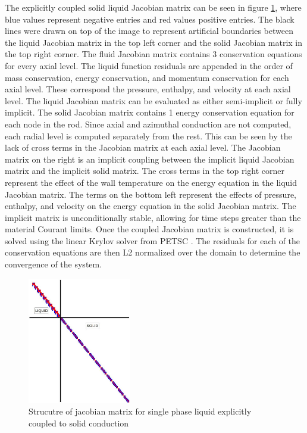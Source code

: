 	The explicitly coupled solid liquid Jacobian matrix can be seen in figure
	\ref{fig:Explicit-Diagram}, where blue values represent negative entries and
	red values positive entries. The black lines were drawn on top of the image to
	represent artificial boundaries between the liquid Jacobian matrix in the top
	left corner and the solid Jacobian matrix in the top right corner. The fluid
	Jacobian matrix contains 3 conservation equations for every axial level. The
	liquid function residuals are appended in the order of mass conservation,
	energy conservation, and momentum conservation for each axial level. These
	correspond the pressure, enthalpy, and velocity at each axial level. The liquid
	Jacobian matrix can be evaluated as either semi-implicit or fully implicit. The
	solid Jacobian matrix contains 1 energy conservation equation for each node in
	the rod. Since axial and azimuthal conduction are not computed, each radial
	level is computed separately from the rest. This can be seen by the lack of
	cross terms in the Jacobian matrix at each axial level. The Jacobian matrix on
	the right is an implicit coupling between the implicit liquid Jacobian matrix
	and the implicit solid matrix. The cross terms in the top right corner
	represent the effect of the wall temperature on the energy equation in the
	liquid Jacobian matrix. The terms on the bottom left represent the effects of
	pressure, enthalpy, and velocity on the energy equation in the solid Jacobian
	matrix. The implicit matrix is unconditionally stable, allowing for time steps
	greater than the material Courant limits. Once the coupled Jacobian matrix is
	constructed, it is solved using the linear Krylov solver from PETSC . The
	residuals for each of the conservation equations are then L2 normalized over
	the domain to determine the convergence of the system.
	
	\begin{figure}[!h]
    	\centering
    	\includegraphics[width=0.40\textwidth]{images/Explicit-Diagram.jpg}
    	\caption{Strucutre of jacobian matrix for single phase liquid
    	explicitly coupled to solid conduction}
    	\label{fig:Explicit-Diagram}
    \end{figure}
    
